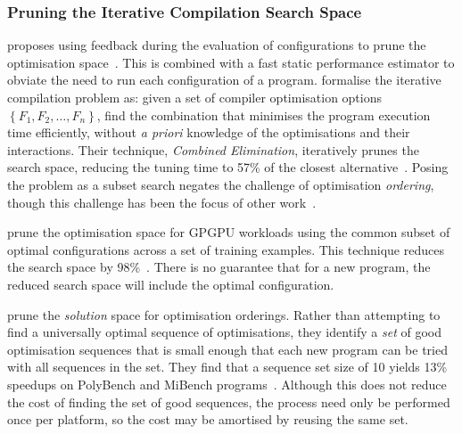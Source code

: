 \subsubsection{Pruning the Iterative Compilation Search Space}

\citeauthor{Triantafyllis2003} proposes using feedback during the evaluation of configurations to prune the optimisation space~\cite{Triantafyllis2003}. This is combined with a fast static performance estimator to obviate the need to run each configuration of a program. \citeauthor{Pan2006} formalise the iterative compilation problem as: given a set of compiler optimisation options $\left\{ F_1, F_2, \ldots, F_n \right\}$, find the combination that minimises the program execution time efficiently, without \emph{a priori} knowledge of the optimisations and their interactions. Their technique, \emph{Combined Elimination}, iteratively prunes the search space, reducing the tuning time to 57\% of the closest alternative~\cite{Pan2006}. Posing the problem as a subset search negates the challenge of optimisation \emph{ordering}, though this challenge has been the focus of other work~\cite{Kulkarni2012,Purini2013}.

\citeauthor{Ryoo2008} prune the optimisation space for GPGPU workloads using the common subset of optimal configurations across a set of training examples. This technique reduces the search space by 98\%~\cite{Ryoo2008}. There is no guarantee that for a new program, the reduced search space will include the optimal configuration.

\citeauthor{Purini2013} prune the \emph{solution} space for optimisation orderings. Rather than attempting to find a universally optimal sequence of optimisations, they identify a \emph{set} of good optimisation sequences that is small enough that each new program can be tried with all sequences in the set. They find that a sequence set size of 10 yields 13\% speedups on PolyBench and MiBench programs~\cite{Purini2013}. Although this does not reduce the cost of finding the set of good sequences, the process need only be performed once per platform, so the cost may be amortised by reusing the same set.

